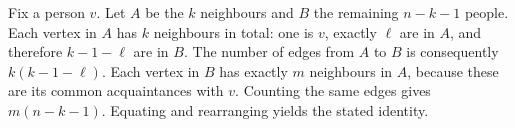 Fix a person $v$. Let $A$ be the $k$ neighbours and $B$ the remaining $n-k-1$ people. Each vertex in $A$ has $k$ neighbours in total: one is $v$, exactly $\ell$ are in $A$, and therefore $k-1-\ell$ are in $B$. The number of edges from $A$ to $B$ is consequently $k(k-1-\ell)$. Each vertex in $B$ has exactly $m$ neighbours in $A$, because these are its common acquaintances with $v$. Counting the same edges gives $m(n-k-1)$. Equating and rearranging yields the stated identity.
